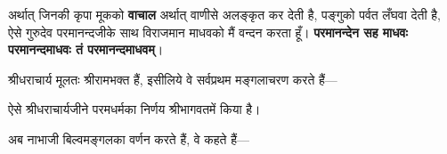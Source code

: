 \begin{sloppypar}\justifying{}
अर्थात् जिनकी कृपा मूकको \textbf{वाचाल} अर्थात् वाणीसे अलङ्कृत कर देती है, पङ्गुको पर्वत लँघवा देती है, ऐसे गुरुदेव परमानन्दजीके साथ विराजमान माधवको मैं वन्दन करता हूँ। \textbf{परमानन्देन सह माधवः परमानन्दमाधवः तं परमानन्दमाधवम्}।
\end{sloppypar}
\begin{sloppypar}\justifying{}
श्रीधराचार्य मूलतः श्रीरामभक्त हैं, इसीलिये वे सर्वप्रथम मङ्गलाचरण करते हैं—
\end{sloppypar}
\begin{sloppypar}\justifying{}
ऐसे श्रीधराचार्यजीने परमधर्मका निर्णय श्रीभागवतमें किया है।
\end{sloppypar}
\begin{sloppypar}\justifying{}
अब नाभाजी बिल्वमङ्गलका वर्णन करते हैं, वे कहते हैं—
\end{sloppypar}


